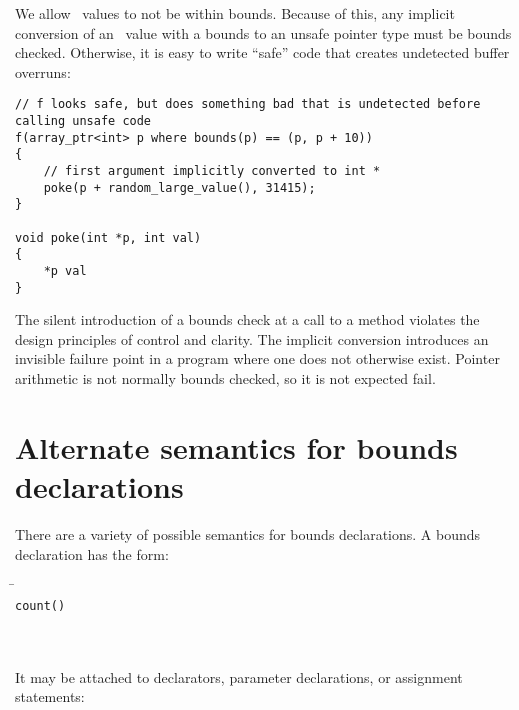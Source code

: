 We allow \arrayptr\ values to not be within bounds. Because of
this, any implicit conversion of an \arrayptr\ value with a
bounds to an unsafe pointer type must be bounds checked. Otherwise, it
is easy to write ``safe'' code that creates undetected buffer overruns:

\begin{verbatim}
// f looks safe, but does something bad that is undetected before calling unsafe code
f(array_ptr<int> p where bounds(p) == (p, p + 10))
{
    // first argument implicitly converted to int *
    poke(p + random_large_value(), 31415);  
}

void poke(int *p, int val)
{
    *p val
}
\end{verbatim}

The silent introduction of a bounds check at a call to a method violates
the design principles of control and clarity. The implicit conversion
introduces an invisible failure point in a program where one does not
otherwise exist. Pointer arithmetic is not normally bounds checked, so
it is not expected fail.

\section{Alternate semantics for bounds declarations}
\label{section:bounds-declarations-alternate-semantics}

There are a variety of possible semantics for
bounds declarations. A bounds declaration has the form:

\begin{quote}
\end{quote}

\begin{tabbing}
\= \\
\> \texttt{count(}\texttt{)} \\
\>  \\
\> \boundsnone \\
\> \boundsany
\end{tabbing}

It may be attached to declarators, parameter declarations, or assignment statements:

